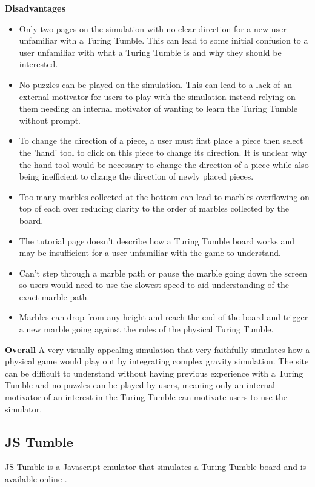 \documentclass{l4proj}
\begin{document}
\textbf{Disadvantages}
\begin{itemize}
    \item Only two pages on the simulation with no clear direction for a new user unfamiliar with a Turing Tumble. This can lead to some initial confusion to a user unfamiliar with what a Turing Tumble is and why they should be interested.
    \item No puzzles can be played on the simulation. This can lead to a lack of an external motivator for users to play with the simulation instead relying on them needing an internal motivator of wanting to learn the Turing Tumble without prompt.
    \item To change the direction of a piece, a user must first place a piece then select the 'hand' tool to click on this piece to change its direction. It is unclear why the hand tool would be necessary to change the direction of a piece while also being inefficient to change the direction of newly placed pieces.
    \item Too many marbles collected at the bottom can lead to marbles overflowing on top of each over reducing clarity to the order of marbles collected by the board.
    \item The tutorial page doesn't describe how a Turing Tumble board works and may be insufficient for a user unfamiliar with the game to understand.
    \item Can't step through a marble path or pause the marble going down the screen so users would need to use the slowest speed to aid understanding of the exact marble path.
    \item Marbles can drop from any height and reach the end of the board and trigger a new marble going against the rules of the physical Turing Tumble.
\end{itemize}

\textbf{Overall}
A very visually appealing simulation that very faithfully simulates how a physical game would play out by integrating complex gravity simulation. The site can be difficult to understand without having previous experience with a Turing Tumble and no puzzles can be played by users, meaning only an internal motivator of an interest in the Turing Tumble can motivate users to use the simulator.

\subsection{JS Tumble}
JS Tumble is a Javascript emulator that simulates a Turing Tumble board and is available online \cite{jstumble}.
\end{document}
